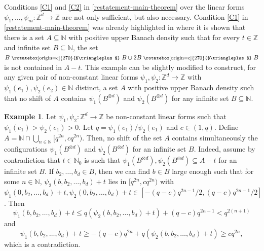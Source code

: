 \documentclass[letter,11pt]{article}
\theoremstyle{definition}
\newtheorem{ex}[theo]{Example}
\newcommand{\N}{\mathbb{N}}
\newcommand{\Z}{\mathbb{Z}}
\newcommand{\gec}{\text{\footnotesize~\rotatebox[origin=c]{270}{$\triangleplus$}~}}
\begin{document}
Conditions \ref{C1} and \ref{C2} in \cref{restatement-main-theorem} over the linear forms $\psi_1,\ldots,\psi_m:\Z^d\to \Z$ are not only sufficient, but also necessary. Condition \ref{C1} in \cref{restatement-main-theorem} was already highlighted in \cite[Example 2.3]{kmrr2023problemsinfinitesumsetconfigurations} where it is shown that there is a set $A\subseteq \N$ with positive upper 
 Banach density  such that for every $t\in \Z$ and infinite set $B\subseteq \N$, the set $B\gec B \cup 2B\gec B$ is not contained in $A-t$. This example can be slightly modified to construct, for any given pair of non-constant linear forms $\psi_1,\psi_2:\Z^d \to \Z$ with $\psi_1(e_1), \psi_2(e_2)\in \N$ distinct, a set $A$ with positive upper Banach density such that no shift of $A$ contains $\psi_1(B^{\otimes d} )$ and $\psi_2(B^{\otimes d})$ for any infinite set $B\subseteq \N$.
 \begin{ex}\label{ex1}
    Let $\psi_1,\psi_2:\Z^d\to \Z$ be non-constant linear forms such that $\psi_1(e_1)>\psi_2(e_1)>0$. Let $q=\psi_1(e_1)/\psi_2(e_1)$ and $c\in (1, q)$. Define $A=\N \cap \bigcup_{n\in \N }[ q^{2n},cq^{2n})$. Then, no shift of the set $A$ contains simultaneously the configurations $\psi_1(B^{\otimes d})$ and $\psi_2(B^{\otimes d})$ for an infinite set $B$. Indeed, assume by contradiction that $t\in \N_0$ is such that $\psi_1(B^{\otimes d}),\psi_2(B^{\otimes d})\subseteq A-t$ for an infinite set $B$. If $b_2,\ldots,b_d\in B$, then we can find $b\in B$ large enough such that for some $n\in \N$, $\psi_2(b,b_2,\ldots,b_d)+t$ lies in $[q^{2n},cq^{2n})$ with $\psi_1(0,b_2,\ldots,b_d)+t, \psi_2(0,b_2,\ldots, b_d)+t \in [-(q-c)q^{2n-1}/2,(q-c)q^{2n-1}/2]$. Then 
     $$ \psi_1(b,b_2,\ldots,b_d)+t \leq q\left(\psi_2(b,b_2,\ldots,b_d)+t\right) +(q-c)q^{2n-1}<q^{2(n+1)}
     $$
     and
     $$\psi_1(b,b_2,\ldots,b_d)+t\geq - (q-c)q^{2n} + q\left(\psi_2(b,b_2,\ldots,b_d)+t\right)\geq c q^{2n},$$
     which is a contradiction.
 \end{ex}
\end{document}
